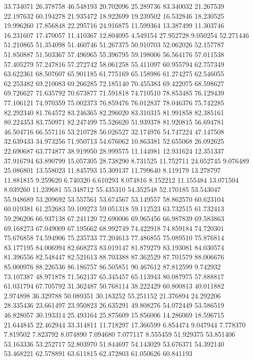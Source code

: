 33.734071
26.378758
46.548193
20.702096
25.289736
83.340032
21.267539
22.197632
60.194278
21.935472
18.922699
19.239502
16.532846
18.230525
19.996260
17.856848
22.295716
24.916875
11.599364
13.387499
11.303746
16.231607
17.470057
11.410367
12.804095
4.549154
27.952728
9.050254
52.271446
51.210865
51.354098
51.460746
51.267375
50.910703
52.062026
52.157787
51.850887
51.503367
57.496965
55.396795
59.198006
56.564176
57.011538
57.405279
57.247816
57.272742
58.061258
55.411097
60.955794
62.757349
63.622361
68.507607
65.901185
61.775169
65.158986
61.274275
62.546055
62.253482
69.210083
69.266285
72.185140
70.455383
69.422075
68.598627
69.726627
71.635792
70.673877
71.591818
74.710510
78.853485
76.129439
77.106121
74.970359
75.002373
76.859476
76.012837
78.046376
75.742285
82.292340
81.764572
83.246365
82.296020
83.310315
81.991858
82.385161
80.224353
83.750971
82.247499
75.526620
51.939378
81.920815
56.694781
46.504716
66.557116
53.210728
56.026527
32.174976
54.747224
47.147508
32.639433
34.973256
71.950713
54.676062
10.863381
52.655068
26.092625
22.690687
63.774877
38.919950
28.999575
11.144981
12.931624
12.351337
37.916794
63.890799
15.057305
28.738290
8.731525
11.752711
24.052745
9.076489
25.086801
13.558023
11.845793
15.309137
11.799640
8.119179
13.278797
11.881815
9.259620
6.740320
6.610293
8.074816
8.152212
11.155484
13.071504
8.039260
11.239681
55.348712
55.435310
54.352548
52.170185
53.543047
55.948689
53.209692
53.557561
53.674567
53.149557
58.862570
60.623104
60.019381
61.252683
59.109273
59.051318
59.112523
63.732515
61.732413
59.296206
66.937138
67.241120
72.690006
69.965456
66.987839
69.583863
69.168273
67.049009
67.195662
68.992749
74.422918
74.859184
74.720301
75.676858
74.594906
75.235733
77.204613
77.486855
75.089510
75.876814
83.177195
84.006994
82.668273
83.019147
81.879279
83.193081
84.030574
81.396556
82.548447
82.521613
88.703388
87.362529
87.701579
88.006676
85.000976
88.226536
86.186757
86.505851
90.467612
87.812599
9.742932
73.107387
48.971878
71.562137
65.345457
65.113943
80.087975
57.888817
61.031794
67.705792
31.362487
50.768114
38.222429
60.800813
40.011882
2.974898
36.329788
50.089351
30.183252
55.251152
21.376894
24.292206
28.335436
23.661497
23.950823
26.635291
49.808276
54.072449
53.586519
46.828057
30.193314
25.493164
25.875609
15.856006
14.286069
18.596715
21.644845
22.462944
33.314811
11.718297
17.366599
6.854474
9.047944
7.778370
7.819502
7.823792
8.074890
7.094680
7.077117
8.555459
51.929375
53.851406
53.163336
53.252717
52.803970
51.844697
54.143029
53.676371
54.392140
53.468221
62.578891
63.611815
62.472803
61.050626
60.841193
